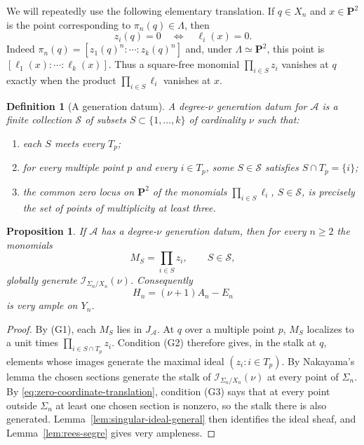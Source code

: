 \documentclass[11pt]{article}
\newtheorem{proposition}[theorem]{Proposition}
\newtheorem{definition}[theorem]{Definition}
\newcommand{\PP}{\mathbf P}
\newcommand{\cI}{\mathcal I}
\newcommand{\cA}{\mathcal A}
\begin{document}
We will repeatedly use the following elementary translation.  If $q\in X_n$ and
$x\in\PP^2$ is the point corresponding to $\pi_n(q)\in\Lambda$, then
\begin{equation}\label{eq:zero-coordinate-translation}
        z_i(q)=0\quad\Longleftrightarrow\quad \ell_i(x)=0.
\end{equation}
Indeed $\pi_n(q)=[z_1(q)^n:\cdots:z_k(q)^n]$ and, under
$\Lambda\simeq\PP^2$, this point is
$[\ell_1(x):\cdots:\ell_k(x)]$.  Thus a square-free monomial
$\prod_{i\in S}z_i$ vanishes at $q$ exactly when the product
$\prod_{i\in S}\ell_i$ vanishes at $x$.

\begin{definition}[A generation datum]\label{def:generation-datum}
A degree-$\nu$ generation datum for $\cA$ is a finite collection
$\mathcal S$ of subsets $S\subset\{1,\ldots,k\}$ of cardinality $\nu$ such that:
\begin{enumerate}[label=\textup{(G\arabic*)}]
\item each $S$ meets every $T_p$;
\item for every multiple point $p$ and every $i\in T_p$, some
      $S\in\mathcal S$ satisfies $S\cap T_p=\{i\}$;
\item the common zero locus on $\PP^2$ of the monomials
      $\prod_{i\in S}\ell_i$, $S\in\mathcal S$, is precisely the set of
      points of multiplicity at least three.
\end{enumerate}
\end{definition}

\begin{proposition}\label{prop:generation-datum}
If $\cA$ has a degree-$\nu$ generation datum, then for every $n\ge2$ the
monomials
\[
        M_S=\prod_{i\in S}z_i,\qquad S\in\mathcal S,
\]
globally generate $\cI_{\Sigma_n/X_n}(\nu)$.  Consequently
\begin{equation}\label{eq:H-general}
        H_n=(\nu+1)A_n-E_n
\end{equation}
is very ample on $Y_n$.
\end{proposition}

\begin{proof}
By (G1), each $M_S$ lies in $J_{\cA}$.  At $q$ over a multiple point $p$,
$M_S$ localizes to a unit times
$\prod_{i\in S\cap T_p}z_i$.  Condition (G2) therefore gives, in the stalk at $q$, elements whose images
generate the maximal ideal $(z_i:i\in T_p)$.  By Nakayama's lemma the chosen
sections generate the stalk of $\cI_{\Sigma_n/X_n}(\nu)$ at every point of
$\Sigma_n$.  By \eqref{eq:zero-coordinate-translation}, condition (G3) says
that at every point outside $\Sigma_n$ at least one chosen section is nonzero,
so the stalk there is also generated.  Lemma~\ref{lem:singular-ideal-general}
then identifies the ideal sheaf, and Lemma~\ref{lem:rees-segre} gives very
ampleness.
\end{proof}
\end{document}
